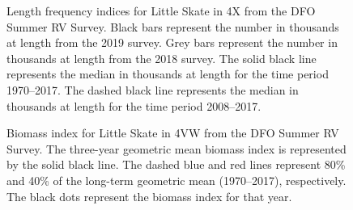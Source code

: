 \documentclass[11pt]{book}
\begin{document}
\begin{figure}[htb]

{\centering {} 

}

\caption{Length frequency indices for Little Skate in 4X from the DFO Summer RV Survey. Black bars represent the number in thousands at length from the 2019 survey. Grey bars represent the number in thousands at length from the 2018 survey. The solid black line represents the median in thousands at length for the time period 1970--2017. The dashed black line represents the median in thousands at length for the time period 2008--2017.}\label{fig:97-fig-littleskate-lengthfreq4X}
\end{figure}

\begin{figure}[htb]

{\centering {} 

}

\caption{Biomass index for Little Skate in 4VW from the DFO Summer RV Survey. The three-year geometric mean biomass index is represented by the solid black line. The dashed blue and red lines represent 80\% and 40\% of the long-term geometric mean (1970--2017), respectively. The black dots represent the biomass index for that year.}\label{fig:98-fig-littleskate-biomass4VW}
\end{figure}
\end{document}
